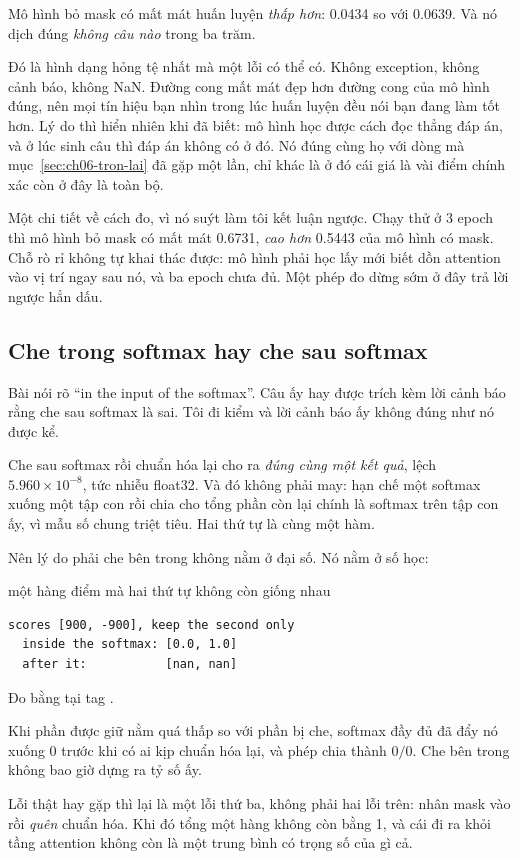 Mô hình bỏ mask có mất mát huấn luyện \emph{thấp hơn}: 0.0434 so với 0.0639. Và
nó dịch đúng \emph{không câu nào} trong ba trăm.

Đó là hình dạng hỏng tệ nhất mà một lỗi có thể có. Không exception, không cảnh
báo, không NaN. Đường cong mất mát đẹp hơn đường cong của mô hình đúng, nên mọi
tín hiệu bạn nhìn trong lúc huấn luyện đều nói bạn đang làm tốt hơn. Lý do thì
hiển nhiên khi đã biết: mô hình học được cách đọc thẳng đáp án, và ở lúc sinh
câu thì đáp án không có ở đó. Nó đúng cùng họ với dòng  mà
mục~\ref{sec:ch06-tron-lai} đã gặp một lần, chỉ khác là ở đó cái giá là vài
điểm chính xác còn ở đây là toàn bộ.

Một chi tiết về cách đo, vì nó suýt làm tôi kết luận ngược. Chạy thử ở 3 epoch
thì mô hình bỏ mask có mất mát 0.6731, \emph{cao hơn} 0.5443 của mô hình có
mask. Chỗ rò rỉ không tự khai thác được: mô hình phải học lấy mới biết dồn
attention vào vị trí ngay sau nó, và ba epoch chưa đủ. Một phép đo dừng sớm ở
đây trả lời ngược hẳn dấu.

\subsection*{Che trong softmax hay che sau softmax}

%
Bài nói rõ \enquote{in the input of the softmax}. Câu ấy hay được trích kèm lời
cảnh báo rằng che sau softmax là sai. Tôi đi kiểm và lời cảnh báo ấy không đúng
như nó được kể.

Che sau softmax rồi chuẩn hóa lại cho ra \emph{đúng cùng một kết quả}, lệch
\(5.960 \times 10^{-8}\), tức nhiễu float32. Và đó không phải may: hạn chế một
softmax xuống một tập con rồi chia cho tổng phần còn lại chính là softmax trên
tập con ấy, vì mẫu số chung triệt tiêu. Hai thứ tự là cùng một hàm.

Nên lý do phải che bên trong không nằm ở đại số. Nó nằm ở số học:

\begin{measured}{một hàng điểm mà hai thứ tự không còn giống nhau}
\begin{verbatim}
scores [900, -900], keep the second only
  inside the softmax: [0.0, 1.0]
  after it:           [nan, nan]
\end{verbatim}

Đo bằng  tại tag .
\end{measured}

Khi phần được giữ nằm quá thấp so với phần bị che, softmax đầy đủ đã đẩy nó
xuống 0 trước khi có ai kịp chuẩn hóa lại, và phép chia thành \(0/0\). Che bên
trong không bao giờ dựng ra tỷ số ấy.

Lỗi thật hay gặp thì lại là một lỗi thứ ba, không phải hai lỗi trên: nhân mask
vào rồi \emph{quên} chuẩn hóa. Khi đó tổng một hàng không còn bằng 1, và cái đi
ra khỏi tầng attention không còn là một trung bình có trọng số của gì cả.
